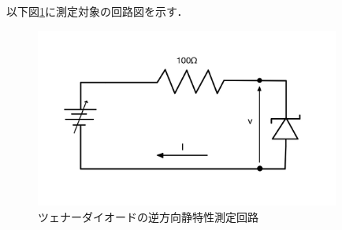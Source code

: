 \documentclass[titlepage]{jarticle}
\begin{document}
以下図\ref{fig:ツェナーダイオードの逆方向静特性測定回路}に測定対象の回路図を示す．
\begin{figure}[H]
    \begin{center}
        \includegraphics[width=10cm]{image/tb.jpg}
        \caption{ツェナーダイオードの逆方向静特性測定回路}
        \label{fig:ツェナーダイオードの逆方向静特性測定回路}
    \end{center}
\end{figure}
\end{document}
